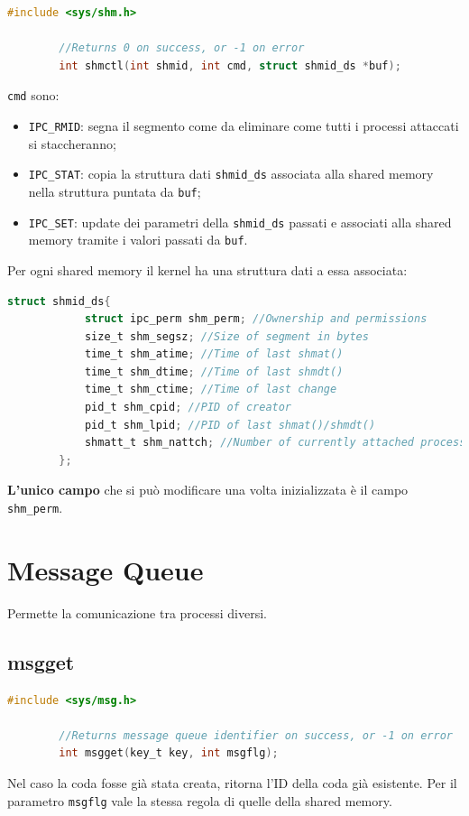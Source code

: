 \documentclass[a4paper, 12pt]{book}
\begin{document}
    \begin{lstlisting}[language=C]
        #include <sys/shm.h>

        //Returns 0 on success, or -1 on error 
        int shmctl(int shmid, int cmd, struct shmid_ds *buf);
    \end{lstlisting}
    \verb|cmd| sono:
    \begin{itemize}
        \item \verb|IPC_RMID|: segna il segmento come da eliminare 
        come tutti i processi attaccati si staccheranno;
        \item \verb|IPC_STAT|: copia la struttura dati \verb|shmid_ds| 
        associata alla shared memory nella struttura puntata da \verb|buf|;
        \item \verb|IPC_SET|: update dei parametri della \verb|shmid_ds| 
        passati e associati alla shared memory tramite i valori 
        passati da \verb|buf|.
    \end{itemize}
    Per ogni shared memory il kernel ha una struttura dati 
    a essa associata:
    \begin{lstlisting}[language=C]
        struct shmid_ds{
            struct ipc_perm shm_perm; //Ownership and permissions 
            size_t shm_segsz; //Size of segment in bytes 
            time_t shm_atime; //Time of last shmat()
            time_t shm_dtime; //Time of last shmdt()
            time_t shm_ctime; //Time of last change 
            pid_t shm_cpid; //PID of creator 
            pid_t shm_lpid; //PID of last shmat()/shmdt()
            shmatt_t shm_nattch; //Number of currently attached processes
        };
    \end{lstlisting}
    \textbf{L'unico campo} che si può modificare una 
    volta inizializzata è il campo \verb|shm_perm|.

    \section{Message Queue}

    Permette la comunicazione tra processi diversi.

    \subsection{msgget}

    \begin{lstlisting}[language=C]
        #include <sys/msg.h>

        //Returns message queue identifier on success, or -1 on error 
        int msgget(key_t key, int msgflg);
    \end{lstlisting}
    Nel caso la coda fosse già stata creata, ritorna l'ID 
    della coda già esistente. Per il parametro \verb|msgflg|
    vale la stessa regola di quelle della shared memory.
\end{document}
